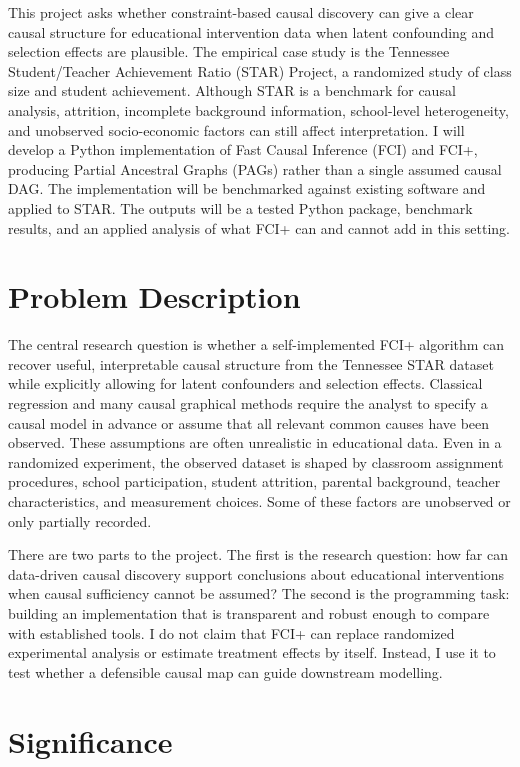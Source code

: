 \documentclass[11pt,a4paper]{article}
\begin{document}
This project asks whether constraint-based causal discovery can give a clear causal structure for educational intervention data when latent confounding and selection effects are plausible. The empirical case study is the Tennessee Student/Teacher Achievement Ratio (STAR) Project, a randomized study of class size and student achievement. Although STAR is a benchmark for causal analysis, attrition, incomplete background information, school-level heterogeneity, and unobserved socio-economic factors can still affect interpretation. I will develop a Python implementation of Fast Causal Inference (FCI) and FCI+, producing Partial Ancestral Graphs (PAGs) rather than a single assumed causal DAG. The implementation will be benchmarked against existing software and applied to STAR. The outputs will be a tested Python package, benchmark results, and an applied analysis of what FCI+ can and cannot add in this setting.

\section*{Problem Description}

The central research question is whether a self-implemented FCI+ algorithm can recover useful, interpretable causal structure from the Tennessee STAR dataset while explicitly allowing for latent confounders and selection effects. Classical regression and many causal graphical methods require the analyst to specify a causal model in advance or assume that all relevant common causes have been observed. These assumptions are often unrealistic in educational data. Even in a randomized experiment, the observed dataset is shaped by classroom assignment procedures, school participation, student attrition, parental background, teacher characteristics, and measurement choices. Some of these factors are unobserved or only partially recorded.

There are two parts to the project. The first is the research question: how far can data-driven causal discovery support conclusions about educational interventions when causal sufficiency cannot be assumed? The second is the programming task: building an implementation that is transparent and robust enough to compare with established tools. I do not claim that FCI+ can replace randomized experimental analysis or estimate treatment effects by itself. Instead, I use it to test whether a defensible causal map can guide downstream modelling.

\section*{Significance}
\end{document}
